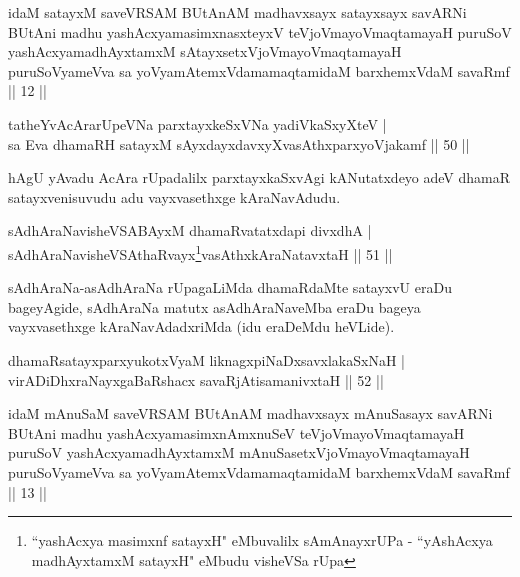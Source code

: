 
\begin{kandikeshl}
idaM satayxM saveVRSAM BUtAnAM madhavxsayx satayxsayx savARNi BUtAni madhu yashAcxyamasimxnasxteyxV teVjoVmayoV\s maqtamayaH puruSoV yashAcxyamadhAyxtamxM sAtayxsetxVjoVmayoV\s maqtamayaH puruSoV\s yameVva sa yoV\s yamAtemxVdamamaqtamidaM barxhemxVdaM savaRmf || 12 ||
\end{kandikeshl}


\begin{shl}
tatheYvA\s \s cArarUpeVNa parxtayxkeSxVNa yadiVkaSxyXteV |\\
sa Eva  dhamaRH satayxM sAyxdayxdavxyXvasAthxparxyoVjakamf \hfill || 50 ||
\end{shl}

\begin{artha}
hAgU yAvadu AcAra rUpadalilx parxtayxkaSxvAgi kANutatxdeyo adeV dhamaR satayxvenisuvudu adu vayxvasethxge kAraNavAdudu.
\end{artha}


\begin{shl}
sAdhAraNavisheVSABAyxM dhamaRvatatxdapi divxdhA |\\
sAdhAraNavisheVSAthaRvayx\footnote{``yashAcxya masimxnf satayxH" eMbuvalilx sAmAnayxrUPa - ``yAshAcxya madhAyxtamxM satayxH" eMbudu visheVSa rUpa}vasAthxkAraNatavxtaH \hfill || 51 ||
\end{shl}

\begin{artha}
sAdhAraNa-asAdhAraNa rUpagaLiMda dhamaRdaMte satayxvU eraDu bageyAgide, sAdhAraNa matutx asAdhAraNaveMba eraDu bageya vayxvasethxge kAraNavAdadxriMda (idu eraDeMdu heVLide).
\end{artha}

\begin{shl}
dhamaRsatayxparxyukotxV\s yaM liknagxpiNaDxsavxlakaSxNaH |\\
virADiDhxraNayxgaBaRshacx savaRjAtisamanivxtaH \hfill || 52 ||
\end{shl}


\begin{kandikeshl}
idaM mAnuSaM saveVRSAM BUtAnAM madhavxsayx mAnuSasayx savARNi BUtAni madhu yashAcxyamasimxnAmxnuSeV teVjoVmayoV\s maqtamayaH puruSoV yashAcxyamadhAyxtamxM mAnuSasetxVjoVmayoV\s maqtamayaH puruSoV\s yameVva sa yoV\s yamAtemxVdamamaqtamidaM barxhemxVdaM savaRmf || 13 ||
\end{kandikeshl}

